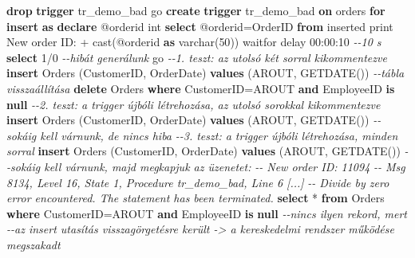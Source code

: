\documentclass[
  magyar,
]{article}
\newenvironment{Shaded}{}{}
\newcommand{\CommentTok}[1]{\textcolor[rgb]{0.38,0.63,0.69}{\textit{#1}}}
\newcommand{\ControlFlowTok}[1]{\textcolor[rgb]{0.00,0.44,0.13}{\textbf{#1}}}
\newcommand{\DataTypeTok}[1]{\textcolor[rgb]{0.56,0.13,0.00}{#1}}
\newcommand{\DecValTok}[1]{\textcolor[rgb]{0.25,0.63,0.44}{#1}}
\newcommand{\FunctionTok}[1]{\textcolor[rgb]{0.02,0.16,0.49}{#1}}
\newcommand{\KeywordTok}[1]{\textcolor[rgb]{0.00,0.44,0.13}{\textbf{#1}}}
\newcommand{\NormalTok}[1]{#1}
\newcommand{\OperatorTok}[1]{\textcolor[rgb]{0.40,0.40,0.40}{#1}}
\newcommand{\StringTok}[1]{\textcolor[rgb]{0.25,0.44,0.63}{#1}}
\begin{document}
\begin{Shaded}
\begin{Highlighting}[]
\KeywordTok{drop} \KeywordTok{trigger}\NormalTok{ tr\_demo\_bad}
\NormalTok{go}
\KeywordTok{create} \KeywordTok{trigger}\NormalTok{ tr\_demo\_bad }\KeywordTok{on}\NormalTok{ orders }\ControlFlowTok{for} \KeywordTok{insert} \KeywordTok{as}
\KeywordTok{declare}\NormalTok{ @orderid }\DataTypeTok{int}
\KeywordTok{select}\NormalTok{ @orderid}\OperatorTok{=}\NormalTok{OrderID }\KeywordTok{from}\NormalTok{ inserted}
\NormalTok{print }\StringTok{\textquotesingle{}New order ID: \textquotesingle{}} \OperatorTok{+} \FunctionTok{cast}\NormalTok{(@orderid }\KeywordTok{as} \DataTypeTok{varchar}\NormalTok{(}\DecValTok{50}\NormalTok{))}
\NormalTok{waitfor delay }\StringTok{\textquotesingle{}00:00:10\textquotesingle{}}  \CommentTok{{-}{-}10 s}
\KeywordTok{select} \DecValTok{1}\OperatorTok{/}\DecValTok{0}  \CommentTok{{-}{-}hibát generálunk}
\NormalTok{go}
\CommentTok{{-}{-}1. teszt: az utolsó két sorral kikommentezve}
\KeywordTok{insert}\NormalTok{ Orders (CustomerID, OrderDate) }\KeywordTok{values}\NormalTok{ (}\StringTok{\textquotesingle{}AROUT\textquotesingle{}}\NormalTok{, GETDATE())}
\CommentTok{{-}{-}tábla visszaállítása}
\KeywordTok{delete}\NormalTok{ Orders }\KeywordTok{where}\NormalTok{ CustomerID}\OperatorTok{=}\StringTok{\textquotesingle{}AROUT\textquotesingle{}} \KeywordTok{and}\NormalTok{ EmployeeID }\KeywordTok{is} \KeywordTok{null}
\CommentTok{{-}{-}2. teszt: a trigger újbóli létrehozása, az utolsó sorokkal kikommentezve}
\KeywordTok{insert}\NormalTok{ Orders (CustomerID, OrderDate) }\KeywordTok{values}\NormalTok{ (}\StringTok{\textquotesingle{}AROUT\textquotesingle{}}\NormalTok{, GETDATE())}
\CommentTok{{-}{-}sokáig kell várnunk, de nincs hiba}
\CommentTok{{-}{-}3. teszt: a trigger újbóli létrehozása, minden sorral}
\KeywordTok{insert}\NormalTok{ Orders (CustomerID, OrderDate) }\KeywordTok{values}\NormalTok{ (}\StringTok{\textquotesingle{}AROUT\textquotesingle{}}\NormalTok{, GETDATE())}
\CommentTok{{-}{-}sokáig kell várnunk, majd megkapjuk az üzenetet:}
\CommentTok{{-}{-} \textquotesingle{}New order ID: 11094}
\CommentTok{{-}{-} Msg 8134, Level 16, State 1, Procedure tr\_demo\_bad, Line 6 [...]}
\CommentTok{{-}{-} Divide by zero error encountered. The statement has been terminated.\textquotesingle{}}
\KeywordTok{select} \OperatorTok{*} \KeywordTok{from}\NormalTok{ Orders }\KeywordTok{where}\NormalTok{ CustomerID}\OperatorTok{=}\StringTok{\textquotesingle{}AROUT\textquotesingle{}} \KeywordTok{and}\NormalTok{ EmployeeID }\KeywordTok{is} \KeywordTok{null}
\CommentTok{{-}{-}nincs ilyen rekord, mert}
\CommentTok{{-}{-}az insert utasítás visszagörgetésre került {-}\textgreater{} a kereskedelmi rendszer működése megszakadt}
\end{Highlighting}
\end{Shaded}
\end{document}
